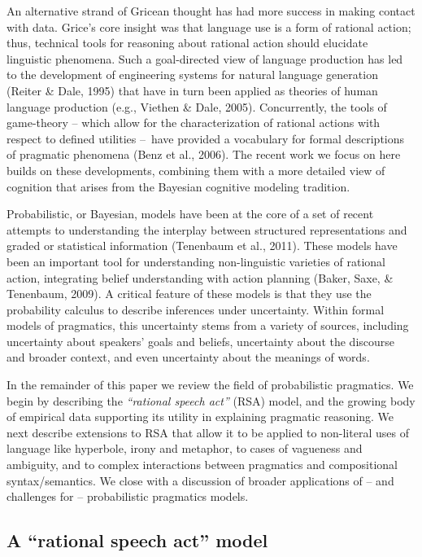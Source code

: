 \documentclass[]{elsarticle}
\begin{document}
An alternative strand of Gricean thought has had more success in making
contact with data. Grice's core insight was that language use is a form
of rational action; thus, technical tools for reasoning about rational
action should elucidate linguistic phenomena. Such a goal-directed view
of language production has led to the development of engineering systems
for natural language generation (Reiter \& Dale, 1995) that have in turn
been applied as theories of human language production (e.g., Viethen \&
Dale, 2005). Concurrently, the tools of game-theory -- which allow for
the characterization of rational actions with respect to defined
utilities --~have provided a vocabulary for formal descriptions of
pragmatic phenomena (Benz et al., 2006). The recent work we focus on
here builds on these developments, combining them with a more detailed
view of cognition that arises from the Bayesian cognitive modeling
tradition.

Probabilistic, or Bayesian, models have been at the core of a set of
recent attempts to understanding the interplay between structured
representations and graded or statistical information (Tenenbaum et al.,
2011). These models have been an important tool for understanding
non-linguistic varieties of rational action, integrating belief
understanding with action planning (Baker, Saxe, \& Tenenbaum, 2009). A
critical feature of these models is that they use the probability
calculus to describe inferences under uncertainty. Within formal models
of pragmatics, this uncertainty stems from a variety of sources,
including uncertainty about speakers' goals and beliefs, uncertainty
about the discourse and broader context, and even uncertainty about the
meanings of words.

In the remainder of this paper we review the field of probabilistic
pragmatics. We begin by describing the \emph{``rational speech act''}
(RSA) model, and the growing body of empirical data supporting its
utility in explaining pragmatic reasoning. We next describe extensions
to RSA that allow it to be applied to non-literal uses of language like
hyperbole, irony and metaphor, to cases of vagueness and ambiguity, and
to complex interactions between pragmatics and compositional
syntax/semantics. We close with a discussion of broader applications of
-- and challenges for -- probabilistic pragmatics models.

\subsection{A ``rational speech act'' model
}\label{a-rational-speech-act-model}
\end{document}
